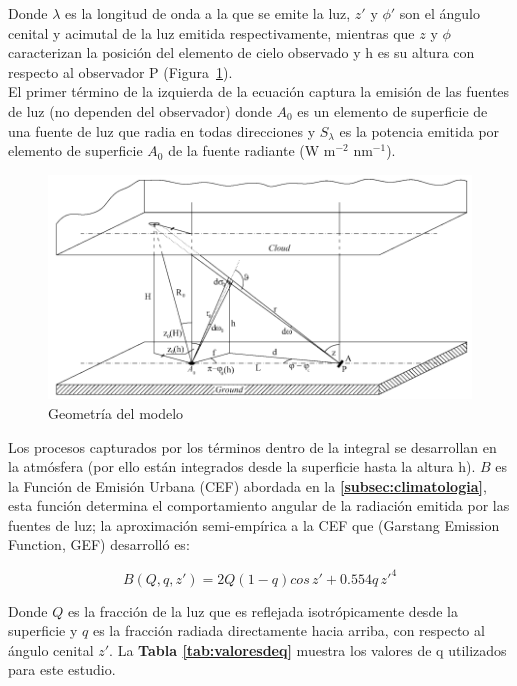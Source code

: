Donde $\lambda$ es la longitud de onda a la que se emite la luz, $z'$ y $\phi'$ son el ángulo cenital y acimutal de la luz emitida respectivamente, mientras que $z$ y $\phi$ caracterizan la posición del elemento de cielo observado y h es su altura con respecto al observador P (Figura~\ref{geometriamodelo}).\\

El primer término de la izquierda de la ecuación captura la emisión de las fuentes de luz (no dependen del observador) donde $A_{0}$ es un elemento de superficie de una fuente de luz que radia en todas direcciones y $S_{\lambda}$ es la potencia emitida por elemento de superficie $A_{0}$ de la fuente radiante (W m$^{-2}$ nm$^{-1}$).\\


\begin{figure}[htb]
  \centering
    \includegraphics[width=1\textwidth]{geometriamodelo}
  \caption{Geometría del modelo \citep{Kocifaj2007}}
  \label{geometriamodelo}
\end{figure}


Los procesos capturados por los términos dentro de la integral se desarrollan en la atmósfera (por ello están integrados desde la superficie hasta la altura h). $B$ es la Función de Emisión Urbana (CEF) abordada en la \textbf{\autoref{subsec:climatologia}}, esta función determina el comportamiento angular de la radiación emitida por las fuentes de luz; la aproximación semi-empírica a la CEF que \cite{Garstang1986} (Garstang Emission Function, GEF) desarrolló es:

\begin{equation}
B(Q, q, z') = 2Q(1-q) cos \, z' + 0.554q \,z'^{4}
\end{equation}

Donde $Q$ es la fracción de la luz que es reflejada isotrópicamente desde la superficie y $q$ es la fracción radiada directamente hacia arriba, con respecto al ángulo cenital $z'$. La \textbf{Tabla \ref{tab:valoresdeq}} muestra los valores de q utilizados para este estudio.


